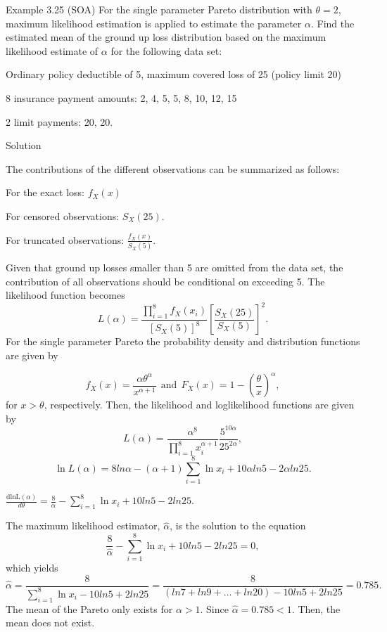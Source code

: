 \documentclass[]{book}
\begin{document}
Example 3.25 (SOA) For the single parameter Pareto distribution with
\(\theta = 2\), maximum likelihood estimation is applied to estimate the
parameter \(\alpha\). Find the estimated mean of the ground up loss
distribution based on the maximum likelihood estimate of \(\alpha\) for
the following data set:

Ordinary policy deductible of 5, maximum covered loss of 25 (policy
limit 20)

8 insurance payment amounts: 2, 4, 5, 5, 8, 10, 12, 15

2 limit payments: 20, 20.

Solution

The contributions of the different observations can be summarized as
follows:

For the exact loss: \(f_{X}\left( x \right)\)

For censored observations: \(S_{X}\left( 25 \right)\).

For truncated observations:
\(\frac{f_{X}\left( x \right)}{S_{X}\left( 5 \right)}\).

Given that ground up losses smaller than 5 are omitted from the data
set, the contribution of all observations should be conditional on
exceeding 5. The likelihood function becomes
\[L\left( \alpha \right) = \frac{\prod_{i = 1}^{8}{f_{X}\left( x_{i} \right)}}{\left\lbrack S_{X}\left( 5 \right) \right\rbrack^{8}}\left\lbrack \frac{S_{X}\left( 25 \right)}{S_{X}\left( 5 \right)} \right\rbrack^{2}.\]
For the single parameter Pareto the probability density and distribution
functions are given by

\[f_{X}\left( x \right) = \frac{\alpha\theta^{\alpha}}{x^{\alpha + 1}} \ \ \text{and} \ \ F_{X}\left( x \right) = 1 - \left( \frac{\theta}{x} \right)^{\alpha},\]
for \(x > \theta\), respectively. Then, the likelihood and loglikelihood
functions are given by
\[L\left( \alpha \right) = \frac{\alpha^{8}}{\prod_{i = 1}^{8}x_{i}^{\alpha + 1}}\frac{5^{10\alpha}}{25^{2\alpha}},\]
\[\ln L \left( \alpha \right) = 8ln\alpha - \left( \alpha + 1 \right)\sum_{i = 1}^{8}{\ln x_{i}} + 10\alpha ln5 - 2\alpha ln25.\]

\(\frac{\text{dlnL}\left( \alpha \right)}{d \theta} = \frac{8}{\alpha} - \sum_{i = 1}^{8}{\ln x_{i}} + 10ln5 - 2ln25\).

The maximum likelihood estimator, \(\hat{\alpha}\), is the solution to
the equation
\[\frac{8}{\hat{\alpha}} - \sum_{i = 1}^{8}{\ln x_{i}} + 10ln5 - 2ln25 = 0,\]which
yields
\[\hat{\alpha} = \frac{8}{\sum_{i = 1}^{8}{\ln x_{i}} - 10ln5 + 2ln25} = \frac{8}{(ln7 + ln9 + \ldots + ln20) - 10ln5 + 2ln25} = 0.785.\]
The mean of the Pareto only exists for \(\alpha > 1\). Since
\(\hat{\alpha} = 0.785 < 1\). Then, the mean does not exist.
\end{document}
